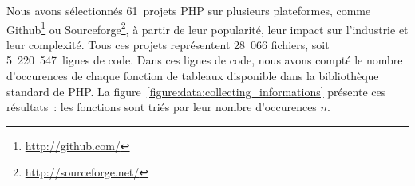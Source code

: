 Nous avons sélectionnés 61~projets PHP sur plusieurs plateformes, comme
Github\footnote{\url{http://github.com/}} ou
Sourceforge\footnote{\url{http://sourceforge.net/}}, à partir de leur
popularité, leur impact sur l'industrie et leur complexité. Tous ces projets
représentent 28~066 fichiers, soit 5~220~547~lignes de code. Dans ces lignes de
code, nous avons compté le nombre d'occurences de chaque fonction de tableaux
disponible dans la bibliothèque standard de PHP. La
figure~\ref{figure:data:collecting_informations} présente ces résultats~: les
fonctions sont triés par leur nombre d'occurences $n$.
%
\begin{figure}

{
\Huge

}
\end{figure}
